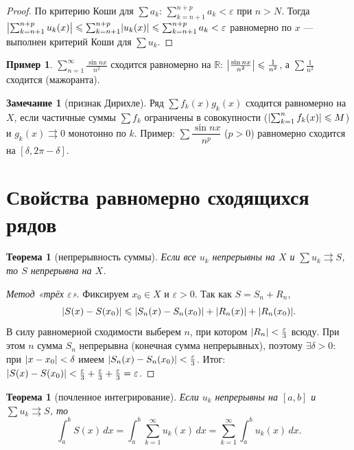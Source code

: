 \documentclass[11pt,a4paper]{article}
\theoremstyle{definition}
\newtheorem{example}[definition]{Пример}
\newtheorem{remark}[definition]{Замечание}
\theoremstyle{plain}
\newtheorem{theorem}[definition]{Теорема}
\newcommand{\R}{\mathbb{R}}
\newcommand{\dx}{\,dx}
\newcommand{\eps}{\varepsilon}
\renewcommand{\le}{\leqslant}
\DeclarePairedDelimiter{\abs}{\lvert}{\rvert}
\begin{document}
\begin{proof}
По критерию Коши для $\sum a_k$: $\sum_{k=n+1}^{n+p}a_k<\eps$ при $n>N$. Тогда
$\abs[\big]{\sum_{k=n+1}^{n+p}u_k(x)}\le\sum_{k=n+1}^{n+p}\abs{u_k(x)}\le\sum_{k=n+1}^{n+p}a_k<\eps$
равномерно по $x$ — выполнен критерий Коши для $\sum u_k$.
\end{proof}

\begin{example}
$\displaystyle\sum_{n=1}^\infty\frac{\sin nx}{n^2}$ сходится равномерно на $\R$:
$\abs[\big]{\tfrac{\sin nx}{n^2}}\le\tfrac1{n^2}$, а $\sum\tfrac1{n^2}$ сходится (мажоранта).
\end{example}

\begin{remark}[признак Дирихле]
Ряд $\sum f_k(x)g_k(x)$ сходится равномерно на $X$, если частичные суммы $\sum f_k$ ограничены в
совокупности ($\abs{\sum_{k=1}^n f_k(x)}\le M$) и $g_k(x)\rightrightarrows0$ монотонно по $k$.
Пример: $\sum\dfrac{\sin nx}{n^p}$ ($p>0$) равномерно сходится на $[\delta,2\pi-\delta]$.
\end{remark}

\section{Свойства равномерно сходящихся рядов}

\begin{theorem}[непрерывность суммы]
Если все $u_k$ непрерывны на $X$ и $\sum u_k\rightrightarrows S$, то $S$ непрерывна на $X$.
\end{theorem}

\begin{proof}[Метод «трёх $\eps$»]
Фиксируем $x_0\in X$ и $\eps>0$. Так как $S=S_n+R_n$,
\[
  \abs{S(x)-S(x_0)}\le\abs{S_n(x)-S_n(x_0)}+\abs{R_n(x)}+\abs{R_n(x_0)} .
\]
В силу равномерной сходимости выберем $n$, при котором $\abs{R_n}<\tfrac\eps3$ всюду. При этом $n$
сумма $S_n$ непрерывна (конечная сумма непрерывных), поэтому $\exists\delta>0$: при
$\abs{x-x_0}<\delta$ имеем $\abs{S_n(x)-S_n(x_0)}<\tfrac\eps3$. Итог:
$\abs{S(x)-S(x_0)}<\tfrac\eps3+\tfrac\eps3+\tfrac\eps3=\eps$.
\end{proof}

\begin{theorem}[почленное интегрирование]
Если $u_k$ непрерывны на $[a,b]$ и $\sum u_k\rightrightarrows S$, то
\[
  \int_a^b S(x)\dx=\int_a^b\sum_{k=1}^\infty u_k(x)\dx=\sum_{k=1}^\infty\int_a^b u_k(x)\dx .
\]
\end{theorem}
\end{document}
